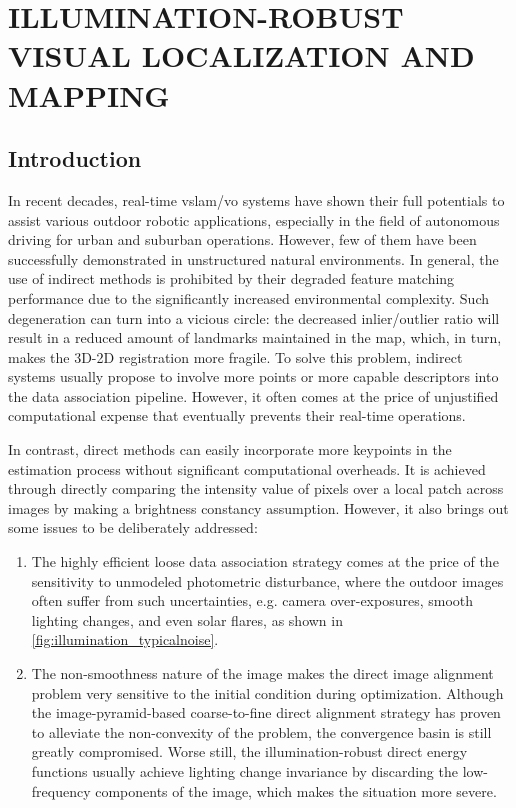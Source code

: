 \chapter{ILLUMINATION-ROBUST VISUAL LOCALIZATION AND MAPPING}

\section{Introduction}

In recent decades, real-time \acrshort{vslam}/\acrshort{vo} systems have shown their full potentials to assist various outdoor robotic applications, especially in the field of autonomous driving for urban and suburban operations.  
However, few of them have been successfully demonstrated in unstructured natural environments.
In general, the use of indirect methods is prohibited by their degraded feature matching performance due to the significantly increased environmental complexity. 
Such degeneration can turn into a vicious circle: the decreased inlier/outlier ratio will result in a reduced amount of landmarks maintained in the map, which, in turn, makes the 3D-2D registration more fragile.   
To solve this problem, indirect systems usually propose to involve more points or more capable descriptors into the data association pipeline.
However, it often comes at the price of unjustified computational expense that eventually prevents their real-time operations. 

In contrast, direct methods can easily incorporate more keypoints in the estimation process without significant computational overheads. 
It is achieved through directly comparing the intensity value of pixels over a local patch across images by making a brightness constancy assumption. 
However, it also brings out some issues to be deliberately addressed:
\begin{enumerate}
	\item The highly efficient loose data association strategy comes at the price of the sensitivity to unmodeled photometric disturbance, where the outdoor images often suffer from such uncertainties, e.g. camera over-exposures, smooth lighting changes, and even solar flares, as shown in \ref{fig:illumination_typicalnoise}. 
	\item The non-smoothness nature of the image makes the direct image alignment problem very sensitive to the initial condition during optimization.
Although the image-pyramid-based coarse-to-fine direct alignment strategy has proven to alleviate the non-convexity of the problem, the convergence basin is still greatly compromised.
Worse still, the illumination-robust direct energy functions usually achieve lighting change invariance by discarding the low-frequency components of the image, which makes the situation more severe. 
\end{enumerate}

